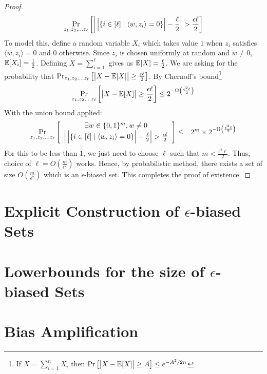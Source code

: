 \begin{proof}
$$\Pr_{z_1,z_2, \ldots z_\ell} \left[ 
\left| \vphantom{2^{2^{2^2}}} \card{\vphantom{2^{2^{2}}}\{i \in [\ell] \mid \langle w,z_i \rangle = 0\}} - \frac{\ell}{2} \right| > \frac{\epsilon\ell}{2}
\right]
$$
To model this, define a random variable $X_i$ which takes value $1$ when $z_i$ satisfies $\langle w,z_i \rangle = 0$ and $0$ otherwise. Since $z_i$ is chosen uniformly at random and $w \ne 0$, ${\mathbb E}[X_i] = \frac{1}{2}$. Defining $X = \sum_{i=1}^\ell$ gives us ${\mathbb E}[X] = \frac{\ell}{2}$. We are asking for the probability that $\Pr_{z_1,z_2, \ldots z_\ell} \left[ \card{\aphantom X - \E[X]} \ge \frac{\epsilon\ell}{2} \right]$. By Chernoff's bound\footnote{If $X = \sum_{i=1}^n{X_i}$ then $\Pr \left[ \card{\aphantom X - \E[X]} \ge A \right] \le e^{-A^2/2n}$}
$$\Pr_{z_1,z_2, \ldots z_\ell} \left[ \card{\aphantom X - \E[X]} \ge \frac{\epsilon\ell}{2} \right] \le 2^{-\Omega\left(\frac{\epsilon^2\ell}{2}\right)}$$
With the union bound applied:
\begin{eqnarray*}
\Pr_{z_1,z_2, \ldots z_\ell} \left[ 
\begin{array}{cc}
 \exists w \in \zo^m, w \ne 0 \\
\left| \vphantom{2^{2^{2^2}}} \card{\vphantom{2^{2^{2}}}\{i \in [\ell] \mid \langle w,z_i \rangle = 0\}} - \frac{\ell}{2} \right| > \frac{\epsilon\ell}{2}
\end{array}
\right]
& \le & 2^m \times 2^{-\Omega\left(\frac{\epsilon^2\ell}{2}\right)}
\end{eqnarray*}
For this to be less than $1$, we just need to choose $\ell$ such that $m < \frac{\epsilon^2\ell}{2}$. Thus, choice of $\ell = O\left(\frac{m}{\epsilon^2}\right)$ works. Hence, by probabilistic method, there exists a set of size $O\left(\frac{m}{\epsilon^2}\right)$ which is an $\epsilon$-biased set. This completes the proof of existence.
\end{proof}

\section{Explicit Construction of $\epsilon$-biased Sets}

\section{Lowerbounds for the size of $\epsilon$-biased Sets}

\section{Bias Amplification}